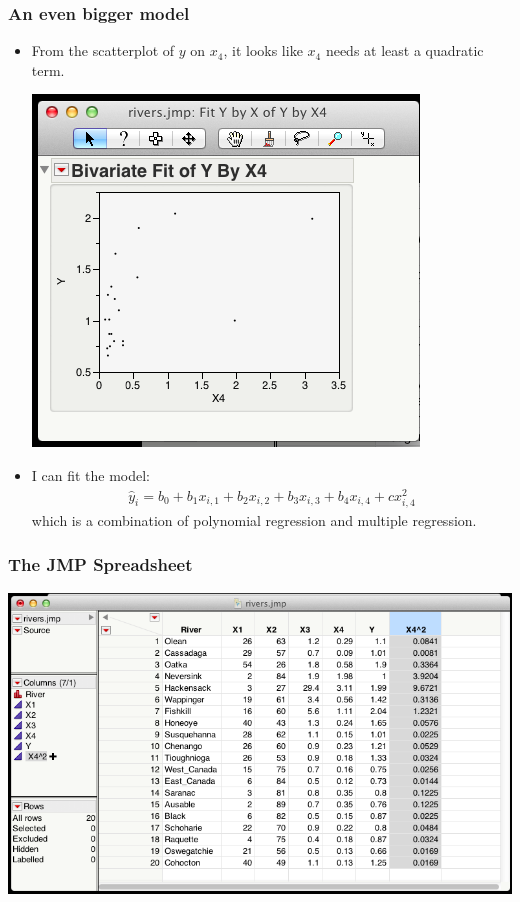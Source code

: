 \documentclass[handout]{beamer}
\providecommand{\wh}[1]{\widehat{#1}}
\numberwithin{equation}{section}
\begin{document}
\begin{frame}
\frametitle{An even bigger model} \small  
\begin{itemize}
\pause \item From the scatterplot of $y$ on $x_4$, it looks like $x_4$ needs at least a quadratic term.
\begin{center}
 \includegraphics{../../fig/x41.png}
\end{center}
\pause \item I can fit the model:
\begin{align*}
\wh{y}_i = b_0 + b_1 x_{i, 1}  + b_2 x_{i, 2} + b_3 x_{i, 3} + b_4 x_{i, 4}  + c x_{i, 4}^2
\end{align*}
\pause which is a combination of polynomial regression and multiple regression.
\end{itemize}
\end{frame}

\begin{frame}
\frametitle{The JMP Spreadsheet}
\begin{center}
 \includegraphics{../../fig/x42.png}
\end{center}
\end{frame}
\end{document}
